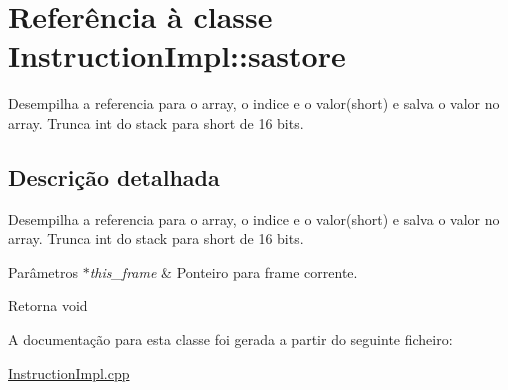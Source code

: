 \hypertarget{class_instruction_impl_1_1sastore}{}\section{Referência à classe Instruction\+Impl\+:\+:sastore}
\label{class_instruction_impl_1_1sastore}


Desempilha a referencia para o array, o indice e o valor(short) e salva o valor no array. Trunca int do stack para short de 16 bits.  




\subsection{Descrição detalhada}
Desempilha a referencia para o array, o indice e o valor(short) e salva o valor no array. Trunca int do stack para short de 16 bits. 


\begin{DoxyParams}{Parâmetros}
{\em $\ast$this\+\_\+frame} & Ponteiro para frame corrente. \\
\hline
\end{DoxyParams}
\begin{DoxyReturn}{Retorna}
void 
\end{DoxyReturn}


A documentação para esta classe foi gerada a partir do seguinte ficheiro\+:\begin{DoxyCompactItemize}
\item 
\hyperlink{_instruction_impl_8cpp}{Instruction\+Impl.\+cpp}\end{DoxyCompactItemize}
